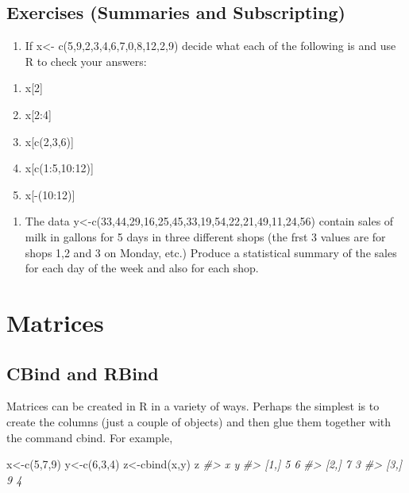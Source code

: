 \documentclass[
]{book}
\newenvironment{Shaded}{\begin{snugshade}}{\end{snugshade}}
\newcommand{\CommentTok}[1]{\textcolor[rgb]{0.56,0.35,0.01}{\textit{#1}}}
\newcommand{\DecValTok}[1]{\textcolor[rgb]{0.00,0.00,0.81}{#1}}
\newcommand{\FunctionTok}[1]{\textcolor[rgb]{0.00,0.00,0.00}{#1}}
\newcommand{\NormalTok}[1]{#1}
\newcommand{\OtherTok}[1]{\textcolor[rgb]{0.56,0.35,0.01}{#1}}
\providecommand{\tightlist}{%
  \setlength{\itemsep}{0pt}\setlength{\parskip}{0pt}}
\begin{document}
\hypertarget{exercises-summaries-and-subscripting}{%
\section{Exercises (Summaries and Subscripting)}\label{exercises-summaries-and-subscripting}}

\begin{enumerate}
\def\labelenumi{\arabic{enumi}.}
\tightlist
\item
  If x\textless- c(5,9,2,3,4,6,7,0,8,12,2,9) decide what each of the following is and use R to
  check your answers:
\end{enumerate}

\begin{enumerate}
\def\labelenumi{(\alph{enumi})}
\tightlist
\item
  x{[}2{]}
\item
  x{[}2:4{]}
\item
  x{[}c(2,3,6){]}
\item
  x{[}c(1:5,10:12){]}
\item
  x{[}-(10:12){]}
\end{enumerate}

\begin{enumerate}
\def\labelenumi{\arabic{enumi}.}
\setcounter{enumi}{1}
\tightlist
\item
  The data y\textless-c(33,44,29,16,25,45,33,19,54,22,21,49,11,24,56) contain sales of milk
  in gallons for 5 days in three different shops (the frst 3 values are for shops 1,2 and 3 on
  Monday, etc.) Produce a statistical summary of the sales for each day of the week and also
  for each shop.
\end{enumerate}

\hypertarget{matrices}{%
\chapter{Matrices}\label{matrices}}

\hypertarget{cbind-and-rbind}{%
\section{CBind and RBind}\label{cbind-and-rbind}}

Matrices can be created in R in a variety of ways. Perhaps the simplest is to create the columns (just a couple of objects) and then glue them together with the command cbind. For example,

\begin{Shaded}
\begin{Highlighting}[]
\NormalTok{x}\OtherTok{\textless{}{-}}\FunctionTok{c}\NormalTok{(}\DecValTok{5}\NormalTok{,}\DecValTok{7}\NormalTok{,}\DecValTok{9}\NormalTok{)}
\NormalTok{y}\OtherTok{\textless{}{-}}\FunctionTok{c}\NormalTok{(}\DecValTok{6}\NormalTok{,}\DecValTok{3}\NormalTok{,}\DecValTok{4}\NormalTok{)}
\NormalTok{z}\OtherTok{\textless{}{-}}\FunctionTok{cbind}\NormalTok{(x,y)}
\NormalTok{z}
\CommentTok{\#\textgreater{}      x y}
\CommentTok{\#\textgreater{} [1,] 5 6}
\CommentTok{\#\textgreater{} [2,] 7 3}
\CommentTok{\#\textgreater{} [3,] 9 4}
\end{Highlighting}
\end{Shaded}
\end{document}
